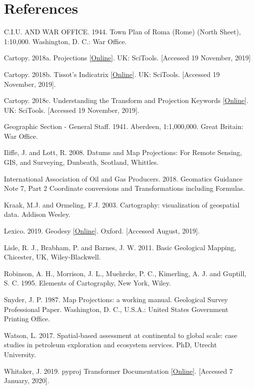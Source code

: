 \documentclass[a4paper , 12pt]{book}
\begin{document}
\section*{References}

C.I.U. AND WAR OFFICE. 1944. Town Plan of Roma (Rome) (North Sheet), 1:10,000. Washington, D. C.: War Office.

Cartopy. 2018a. Projections [\href{https://scitools.org.uk/cartopy/docs/latest/crs/projections.html}{Online}]. UK: SciTools. [Accessed 19 November, 2019]

Cartopy. 2018b. Tissot’s Indicatrix [\href{https://scitools.org.uk/cartopy/docs/latest/gallery/tissot.html}{Online}]. UK: SciTools. [Accessed 19 November, 2019].

Cartopy. 2018c. Understanding the Transform and Projection Keywords [\href{https://scitools.org.uk/cartopy/docs/latest/tutorials/understanding_transform.html}{Online}]. UK: SciTools. [Accessed 19 November, 2019].

Geographic Section - General Staff. 1941. Aberdeen, 1:1,000,000. Great Britain: War Office.

Iliffe, J. and Lott, R. 2008. Datums and Map Projections: For Remote Sensing, GIS, and Surveying, Dunbeath, Scotland, Whittles.

International Association of Oil and Gas Producers. 2018. Geomatics Guidance Note 7, Part 2 Coordinate conversions and Transformations including Formulas.

Kraak, M.J. and Ormeling, F.J. 2003. Cartography: visualization of geospatial data. Addison Wesley.

Lexico. 2019. Geodesy [\href{https://www.lexico.com/en/definition/geodesy}{Online}]. Oxford. [Accessed August, 2019].

Lisle, R. J., Brabham, P. and Barnes, J. W. 2011. Basic Geological Mapping, Chicester, UK, Wiley-Blackwell.

Robinson, A. H., Morrison, J. L., Muehrcke, P. C., Kimerling, A. J. and Guptill, S. C. 1995. Elements of Cartography, New York, Wiley.

Snyder, J. P. 1987. Map Projections: a working manual. Geological Survey Professional Paper. Washington, D. C., U.S.A.: United States Government Printing Office.

Watson, L. 2017. Spatial-based assessment at continental to global scale: case studies in petroleum exploration and ecosystem services. PhD, Utrecht University.

Whitaker, J. 2019. pyproj Transformer Documentation [\href{https://pyproj4.github.io/pyproj/stable/api/transformer.html?highlight=transformer}{Online}].  [Accessed 7 January, 2020].
\end{document}
